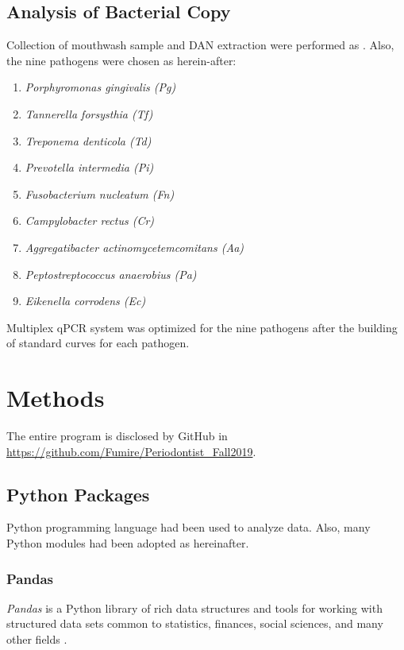 \documentclass[aps, 11pt, a4paper]{article}
\begin{document}
	    \subsection{Analysis of Bacterial Copy}
	    	Collection of mouthwash sample and DAN extraction were performed as \cite{ref:DNA1}. Also, the nine pathogens were chosen as herein-after:
	    	\begin{enumerate}
				\item \textit{Porphyromonas gingivalis (Pg)}
				\item \textit{Tannerella forsysthia (Tf)}
				\item \textit{Treponema denticola (Td)}
				\item \textit{Prevotella intermedia (Pi)}
				\item \textit{Fusobacterium nucleatum (Fn)}
				\item \textit{Campylobacter rectus (Cr)}
				\item \textit{Aggregatibacter actinomycetemcomitans (Aa)}
				\item \textit{Peptostreptococcus anaerobius (Pa)}
				\item \textit{Eikenella corrodens (Ec)}
	    	\end{enumerate}
    	
    		Multiplex qPCR system was optimized for the nine pathogens after the building of standard curves for each pathogen. 
    
    \section{Methods}
    	The entire program is disclosed by GitHub in \url{https://github.com/Fumire/Periodontist_Fall2019}. 
    
    	\subsection{Python Packages}
    		Python programming language had been used to analyze data. Also, many Python modules had been adopted as hereinafter.
    		
    		\subsubsection{Pandas}
    		\textit{Pandas} is a Python library of rich data structures and tools for working with structured data sets common to statistics, finances, social sciences, and many other fields \cite{ref:pandas1}.
    		
\end{document}
